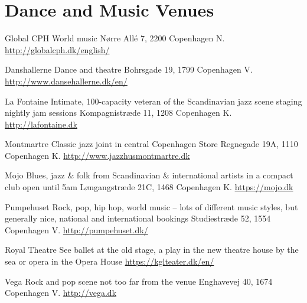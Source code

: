 \section*{Dance and Music Venues}
\begin{shopitem}
{Global CPH}%
{World music}%
{Nørre Allé 7, 2200 Copenhagen N.}%
{\url{http://globalcph.dk/english/}}%
\end{shopitem}

\begin{shopitem}
{Danshallerne}%
{Dance and theatre}%
{Bohrsgade 19, 1799 Copenhagen V.}%
{\url{http://www.dansehallerne.dk/en/}}%
\end{shopitem}

\begin{shopitem}
{La Fontaine}%
{Intimate, 100-capacity veteran of the Scandinavian jazz scene staging nightly jam sessions}%
{Kompagnistræde 11, 1208 Copenhagen K.}%
{\url{http://lafontaine.dk}}%
\end{shopitem}

\begin{shopitem}
{Montmartre}%
{Classic jazz joint in central Copenhagen}%
{Store Regnegade 19A, 1110 Copenhagen K.}%
{\url{http://www.jazzhusmontmartre.dk}}%
\end{shopitem}

\begin{shopitem}
{Mojo}%
{Blues, jazz \& folk from Scandinavian \& international artists in a compact club open until 5am}%
{Løngangstræde 21C, 1468 Copenhagen K.}%
{\url{https://mojo.dk}}%
\end{shopitem}

\begin{shopitem}
{Pumpehuset}%
{Rock, pop, hip hop, world music -- lots of different music styles, but generally nice, national and international bookings}%
{Studiestræde 52, 1554 Copenhagen V.}%
{\url{http://pumpehuset.dk/}}%
\end{shopitem}

\begin{shopitem}
{Royal Theatre}%
{See ballet at the old stage, a play in the new theatre house by the sea or opera in the Opera House}%
{}%
{\url{https://kglteater.dk/en/}}%
\end{shopitem}

\begin{shopitem}
{Vega}%
{Rock and pop scene not too far from the venue}%
{Enghavevej 40, 1674 Copenhagen V.}%
{\url{http://vega.dk}}%
\end{shopitem}



